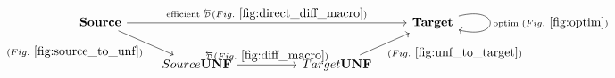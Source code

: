 \[
\begin{tikzcd}
    \Source \ar[rrrr,"\text{efficient }\Dsynrevsymbol (Fig.~\ref{fig:direct_diff_macro})"] \ar[dr,"(Fig.~\ref{fig:source_to_unf})"'] &&&& \Target \arrow[r,loop right,"\text{optim }(Fig.~\ref{fig:optim})"] \\
    & Source\UNFSymbol \ar[rr,"\Dsynrevsymbol (Fig.~\ref{fig:diff_macro})"] && Target\UNFSymbol \ar[ur,"(Fig.~\ref{fig:unf_to_target})"'] & 
\end{tikzcd}
\]